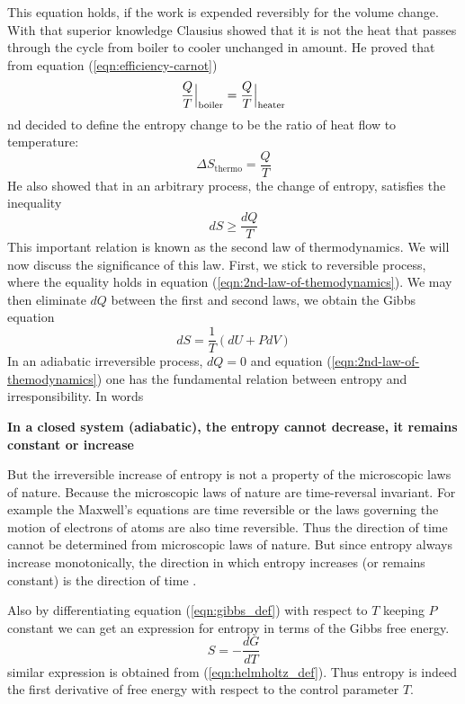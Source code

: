 	This equation holds, if the work is expended reversibly for the volume change. With that superior	knowledge Clausius showed that it is not the heat that passes through the cycle from boiler to	cooler unchanged in amount. He proved that from equation (\ref{eqn:efficiency-carnot})
	\begin{equation}
		\frac{Q}{T}\at[\Big]{\text{boiler}} =
		\frac{Q}{T}\at[\Big]{\text{heater}}
	\end{equation}
	nd decided to define the entropy change to be the ratio of heat flow to temperature: \cite{Sethna2006}
	\begin{equation}
		\Delta S_{\text{thermo}} = \frac{Q}{T}
	\end{equation}
	He also showed that in an arbitrary process, the change of entropy, satisfies the inequality
	\begin{equation}
		dS \geq \frac{dQ}{T}
		\label{eqn:2nd-law-of-themodynamics}
	\end{equation}
	This important relation is known as the second law of thermodynamics. We will now discuss the significance of this law.
	First, we stick to reversible process, where the equality holds in equation (\ref{eqn:2nd-law-of-themodynamics}). We may then eliminate $dQ$ between the first and second laws, we obtain the Gibbs equation
	\begin{equation}
		dS = \frac{1}{T} \left(dU + P dV\right)
	\end{equation}
	In an adiabatic irreversible process, $dQ = 0$ and equation (\ref{eqn:2nd-law-of-themodynamics}) one has the fundamental relation between entropy and irresponsibility. In words
	
	\textbf{In a closed system (adiabatic), the entropy cannot decrease, it remains constant or increase \cite{Benguigui2013}}
		
	But the irreversible increase of entropy is not a property of the microscopic laws of nature. Because the microscopic laws of nature are time-reversal invariant. For example the Maxwell's equations are time reversible or the laws governing the motion of electrons of atoms are also time reversible. Thus the direction of time cannot be determined from microscopic laws of nature. But since entropy always increase monotonically, the direction in which entropy increases (or remains constant) is the direction of time \cite{Sethna2006}.
	
	
	Also by differentiating equation (\ref{eqn:gibbs_def}) with respect to $T$ keeping $P$ constant we can get an expression for entropy in terms of the Gibbs free energy.
	\begin{equation}
		S = -\frac{dG}{dT}
	\end{equation}
	similar expression is obtained from (\ref{eqn:helmholtz_def}). Thus entropy is indeed the first derivative of free energy with respect to the control parameter $T$.
	

